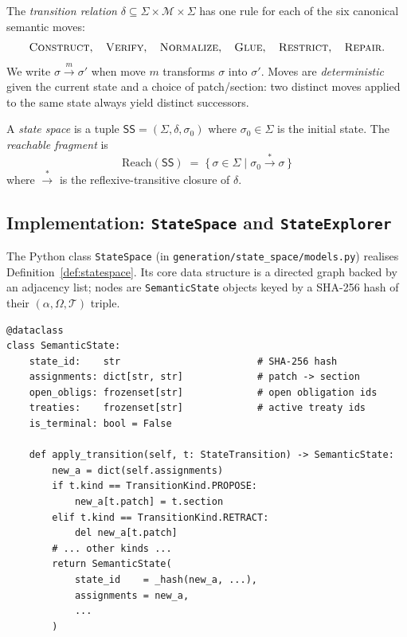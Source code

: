 \documentclass[11pt]{article}
\newcommand{\St}{\Sigma}                      %
\newcommand{\state}{\sigma}                   %
\newcommand{\Trans}{\delta}                   %
\newcommand{\reach}{\mathrm{Reach}}           %
\begin{document}
\begin{definition}\label{def:trans}
The \emph{transition relation} $\Trans \subseteq \St \times \mathcal{M}
\times \St$ has one rule for each of the six canonical semantic moves:
\[
  \textsc{Construct},\quad \textsc{Verify},\quad \textsc{Normalize},\quad
  \textsc{Glue},\quad \textsc{Restrict},\quad \textsc{Repair}.
\]
We write $\state \xrightarrow{m} \state'$ when move $m$ transforms
$\state$ into $\state'$.  Moves are \emph{deterministic} given the
current state and a choice of patch/section: two distinct moves applied
to the same state always yield distinct successors.
\end{definition}

\begin{definition}\label{def:statespace}
A \emph{state space} is a tuple $\mathsf{SS} = (\St, \Trans, \state_0)$
where $\state_0 \in \St$ is the initial state.  The \emph{reachable
fragment} is
\[
  \reach(\mathsf{SS}) \;=\;
  \{\,\state \in \St \mid \state_0 \xrightarrow{*} \state\,\}
\]
where $\xrightarrow{*}$ is the reflexive-transitive closure of
$\Trans$.
\end{definition}

\subsection{Implementation: \texttt{StateSpace} and \texttt{StateExplorer}}

The Python class \texttt{StateSpace} (in
\texttt{generation/state\_space/models.py}) realises
Definition~\ref{def:statespace}.  Its core data structure is a
directed graph backed by an adjacency list; nodes are
\texttt{SemanticState} objects keyed by a SHA-256 hash of their
$(\alpha, \Omega, \mathcal{T})$ triple.

\begin{lstlisting}[style=jugeo-python, caption={Core \texttt{SemanticState} fields (simplified).}]
@dataclass
class SemanticState:
    state_id:    str                        # SHA-256 hash
    assignments: dict[str, str]             # patch -> section
    open_obligs: frozenset[str]             # open obligation ids
    treaties:    frozenset[str]             # active treaty ids
    is_terminal: bool = False

    def apply_transition(self, t: StateTransition) -> SemanticState:
        new_a = dict(self.assignments)
        if t.kind == TransitionKind.PROPOSE:
            new_a[t.patch] = t.section
        elif t.kind == TransitionKind.RETRACT:
            del new_a[t.patch]
        # ... other kinds ...
        return SemanticState(
            state_id    = _hash(new_a, ...),
            assignments = new_a,
            ...
        )
\end{lstlisting}
\end{document}
